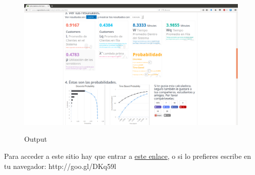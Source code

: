 \begin{figure}[h]
	\centering
	\includegraphics[width=\textwidth]{soft2}
	\label{soft2}
	\caption{Output}
\end{figure}

Para acceder a este sitio hay que entrar a \href{http://www.supositorio.com/rcalc/rcalclite_esp.htm}{este enlace}, o si lo prefieres escribe en tu navegador: http://goo.gl/DKq59l